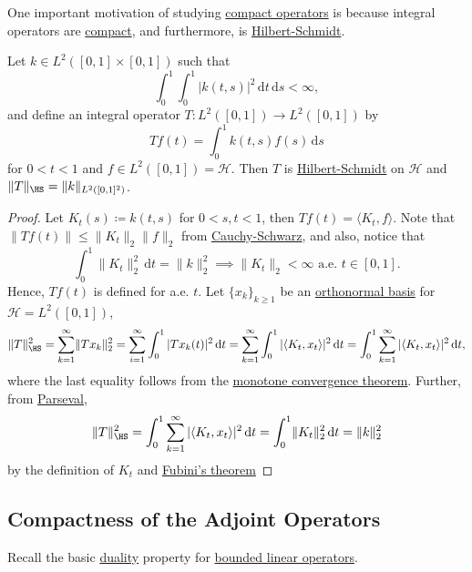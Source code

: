 One important motivation of studying \hyperref[def:compact-op]{compact operators} is because integral operators are \hyperref[def:compact-op]{compact}, and furthermore, is \hyperref[def:Hilbert-Schmidt-op]{Hilbert-Schmidt}.

\begin{proposition}\label{prop:Hilbert-Schmidt-integral-op}
	Let \(k\in L^2([0, 1]\times [0, 1])\) such that
	\[
		\int _0^1 \int _0^1 \vert k(t, s) \vert ^{2} \,\mathrm{d} t\,\mathrm{d} s < \infty,
	\]
	and define an integral operator \(T\colon L^2([0, 1])\to L^2([0, 1])\) by
	\[
		Tf(t) = \int _0^1 k(t, s)f(s)\,\mathrm{d} s
	\]
	for \(0 < t < 1\) and \(f\in L^2([0, 1])= \mathcal{H} \). Then \(T\) is \hyperref[def:Hilbert-Schmidt-op]{Hilbert-Schmidt} on \(\mathcal{H} \) and \(\lVert T \rVert _{\HS }= \lVert k \rVert _{L^2([0, 1]^2)}\).
\end{proposition}
\begin{proof}
	Let \(K_t(s) \coloneqq k(t, s)\) for \(0<s, t<1\), then \(Tf(t) = \langle K_t, f \rangle \). Note that \(\lVert Tf(t) \rVert \leq \lVert K_t \rVert _2 \lVert f \rVert _2\) from \hyperref[thm:Cauchy-Schwarz-ineq]{Cauchy-Schwarz}, and also, notice that
	\[
		\int_{0}^{1} \lVert K_t \rVert ^2_2 \,\mathrm{d}t
		= \lVert k \rVert _2^2
		\implies \lVert K_t \rVert _2<\infty \text{ a.e. }t\in [0,1].
	\]
	Hence, \(Tf(t)\) is defined for a.e. \(t\). Let \(\{ x_k \} _{k \geq 1}\) be an \hyperref[def:orthonormal-basis]{orthonormal basis} for \(\mathcal{H} =L^2([0, 1])\),
	\[
		\lVert T \rVert ^2 _{\HS }
		= \sum_{k=1}^{\infty} \lVert T x_{k} \rVert _2^2
		= \sum_{i=1}^{\infty} \int _0^1 \vert T x_{k} (t) \vert ^2 \,\mathrm{d} t
		= \sum_{k=1}^{\infty} \int _0^1 \vert \langle K_{t} , x_{t} \rangle \vert ^2 \,\mathrm{d} t
		= \int _0^1 \sum_{k=1}^{\infty}\vert \langle K_{t} , x_{t} \rangle \vert ^2 \,\mathrm{d} t ,
	\]
	where the last equality follows from the \href{https://en.wikipedia.org/wiki/Monotone_convergence_theorem}{monotone convergence theorem}. Further, from \hyperref[col:Parseval]{Parseval},
	\[
		\lVert T \rVert ^2 _{\HS }
		= \int _0^1 \sum_{k=1}^{\infty}\vert \langle K_{t} , x_{t} \rangle \vert ^2 \,\mathrm{d} t
		= \int _0^1 \lVert K_t \rVert _2^2 \,\mathrm{d} t
		= \lVert k \rVert _2^2
	\]
	by the definition of \(K_t\) and \href{https://en.wikipedia.org/wiki/Fubini's_theorem}{Fubini's theorem}
\end{proof}

\subsection{Compactness of the Adjoint Operators}
Recall the basic \hyperref[def:dual-space]{duality} property for \hyperref[def:bounded-linear-op]{bounded linear operators}.

